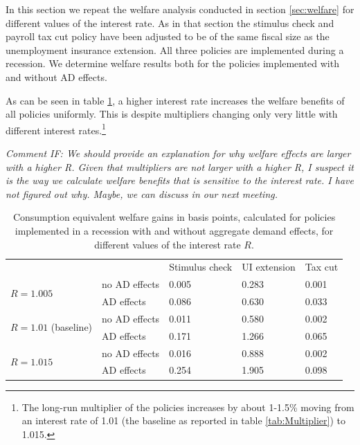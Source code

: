 \documentclass[../HAFiscal]{subfiles}
\begin{document}
In this section we repeat the welfare analysis conducted in section \ref{sec:welfare} for different values of the interest rate. As in that section the stimulus check and payroll tax cut policy have been adjusted to be of the same fiscal size as the unemployment insurance extension. All three policies are implemented during a recession. We determine welfare results both for the policies implemented with and without AD effects.

As can be seen in table \ref{tab:robustness_R_results}, a higher interest rate increases the welfare benefits of all policies uniformly. This is despite multipliers changing only very little with different interest rates.\footnote{The long-run multiplier of the policies increases by about 1-1.5\% moving from an interest rate of 1.01 (the baseline as reported in table \ref{tab:Multiplier}) to 1.015.} 

\textit{Comment IF: We should provide an explanation for why welfare effects are larger with a higher R. Given that multipliers are not larger with a higher R, I suspect it is the way we calculate welfare benefits that is sensitive to the interest rate. I have not figured out why. Maybe, we can discuss in our next meeting.}


\begin{table}[]
	\begin{center}
		\begin{tabular}{@{}lllll@{}}
			\toprule
			&                    & Stimulus check & UI extension & Tax cut \\ \cmidrule(l){1-5} 
			\multirow{2}{*}{$R = 1.005$}            	& no AD effects & 0.005        & 0.283       & 0.001\\
														& AD effects    & 0.086        & 0.630       & 0.033  \\
			\multirow{2}{*}{$R = 1.01$ (baseline)} 		& no AD effects & 0.011        & 0.580       & 0.002   \\
														& AD effects    & 0.171        & 1.266       & 0.065   \\
			\multirow{2}{*}{$R = 1.015$}            	& no AD effects & 0.016        & 0.888       & 0.002   \\
														& AD effects    & 0.254        & 1.905       & 0.098    \\ \cmidrule(l){1-5} 
		\end{tabular}
		\caption{Consumption equivalent welfare gains in basis points, calculated for policies implemented in a recession with and without aggregate demand effects, for different values of the interest rate $R$.}
		\label{tab:robustness_R_results}
	\end{center}
\end{table}
\end{document}
